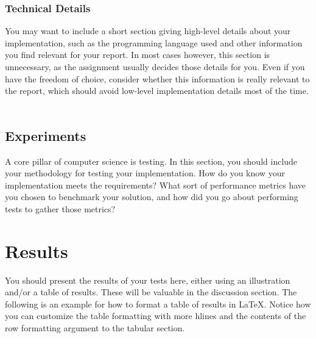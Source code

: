 \documentclass{article}
\begin{document}
\begin{flushleft}
\subsubsection{Technical Details}
You may want to include a short section giving high-level details about your implementation, such as the programming language used and other information you find relevant for your report. In most cases however, this section is unnecessary, as the assignment usually decides those details for you. Even if you have the freedom of choice, consider whether this information is really relevant to the report, which should avoid low-level implementation details most of the time. \ 

\subsection{Experiments}
A core pillar of computer science is testing. In this section, you should include your methodology for testing your implementation. How do you know your implementation meets the requirements? What sort of performance metrics have you chosen to benchmark your solution, and how did you go about performing tests to gather those metrics?


\section{Results}
You should present the results of your tests here, either using an illustration and/or a table of results. These will be valuable in the discussion section.
The following is an example for how to format a table of results in \LaTeX.
Notice how you can customize the table formatting with more hlines and the contents of the row formatting argument to the tabular section.

\begin{table}[h!]
    \begin{center}
        \caption{Accumulated join and leave times}
        \label{table:testing}
    \end{center}
\end{table}



\end{flushleft}
\end{document}
